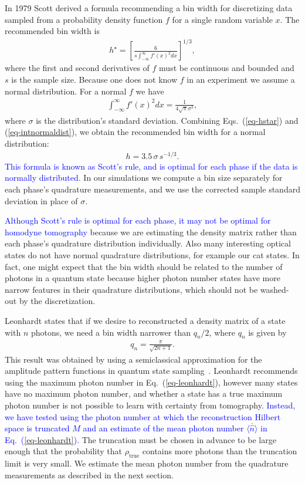 \documentclass[
reprint,
superscriptaddress,
showpacs,
amsmath,
amssymb,
aps,
pra,
longbibliography
]{revtex4-1}
\providecommand{\editcolor}[2]{\textcolor{#1}{#2}}
\providecommand{\editcolor}[2]{#2}
\newcommand{\HV}[1]{\editcolor{blue}{#1}}
\newcommand{\rhotrue}{\rho_{\text{true}}}
\begin{document}
In 1979 Scott derived a formula recommending a bin width for discretizing 
data sampled from a probability density function $f$ for a single random variable
$x$. The recommended bin width is
\begin{eqnarray}
  h^{\star} = \left[ \frac{6}{s \int_{-\infty}^{\infty} f'(x)^2 dx} \right]^{1/3},
  \label{eq-hstar}
\end{eqnarray}
where the first and second derivatives of $f$ must be continuous and bounded and 
$s$ is the sample size. Because one does not know $f$ in an experiment we 
assume a normal distribution. For a normal $f$ we have
\begin{eqnarray}
  \int_{-\infty}^{\infty} f'(x)^2 dx = \frac{1}{4 \sqrt{\pi} \sigma ^3},
  \label{eq-intnormaldist}
\end{eqnarray}
where $\sigma$ is the distribution's standard deviation. 
Combining Eqs.~(\ref{eq-hstar}) and (\ref{eq-intnormaldist}), we obtain the recommended
bin width for a normal distribution:
\begin{eqnarray}
  h = 3.5 \, \sigma \, s^{-1/3}.
\end{eqnarray}
\HV{This formula is known as Scott's rule, and is optimal for each phase 
if the data is normally distributed.} In our simulations we compute a bin size
separately for each phase's quadrature measurements, and we use the
corrected sample standard deviation in place of $\sigma$.

\HV{Although Scott's rule is optimal for each phase, it may not be optimal
for homodyne tomography} because we are estimating the density matrix
rather than each phase's quadrature distribution individually.  Also
many interesting optical states do not have normal quadrature
distributions, for example our cat states.  In fact, one might
expect that the bin width should be related to the number of photons
in a quantum state because higher photon number states have more
narrow features in their quadrature distributions, which should not
be washed-out by the discretization. 
  
Leonhardt states that if we desire to reconstructed a density matrix of a 
state with $n$ photons, we need a bin width narrower than $q_n/2$, 
where $q_n$ is given by
\begin{eqnarray}
  q_n = \frac{\pi}{\sqrt{2 n + 1}}.
  \label{eq-leonhardt}
\end{eqnarray}
This result was obtained by using a semiclassical approximation for the amplitude
pattern functions in quantum state sampling~\cite{Leonhardt1996}. Leonhardt 
recommends using the maximum photon number in Eq.~(\ref{eq-leonhardt}), however
many states have no maximum photon number, and whether a state has a
true maximum photon number is not possible to learn with certainty
from tomography.  \HV{Instead, we have tested using the photon number at
which the reconstruction Hilbert space is truncated $M$ and an estimate 
of the mean photon number $\overline{\langle \hat{n} \rangle}$ in 
Eq.~(\ref{eq-leonhardt}).} The truncation must be chosen
in advance to be large enough that the probability that $\rhotrue$
contains more photons than the truncation limit is very small.  We
estimate the mean photon number from the quadrature measurements as
described in the next section.
\end{document}

